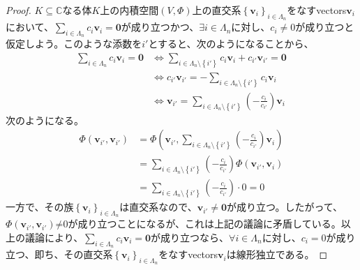 \documentclass[dvipdfmx]{jsarticle}
\begin{document}
\begin{proof}
$K \subseteq \mathbb{C}$なる体$K$上の内積空間$(V,\varPhi)$上の直交系$\left\{ \mathbf{v}_{i} \right\}_{i \in \varLambda_{n}}$をなすvectors$\mathbf{v}_{i}$において、$\sum_{i \in \varLambda_{n}} {c_{i}\mathbf{v}_{i}} = \mathbf{0}$が成り立つかつ、$\exists i \in \varLambda_{n}$に対し、$c_{i} \neq 0$が成り立つと仮定しよう。このような添数を$i'$とすると、次のようになることから、
\begin{align*}
\sum_{i \in \varLambda_{n}} {c_{i}\mathbf{v}_{i}} = \mathbf{0} &\Leftrightarrow \sum_{i \in \varLambda_{n} \setminus \left\{ i' \right\}} {c_{i}\mathbf{v}_{i}} + c_{i'}\mathbf{v}_{i'} = \mathbf{0}\\
&\Leftrightarrow c_{i'}\mathbf{v}_{i'} = - \sum_{i \in \varLambda_{n} \setminus \left\{ i' \right\}} {c_{i}\mathbf{v}_{i}}\\
&\Leftrightarrow \mathbf{v}_{i'} = \sum_{i \in \varLambda_{n} \setminus \left\{ i' \right\}} {\left( - \frac{c_{i}}{c_{i'}} \right)\mathbf{v}_{i}}
\end{align*}
次のようになる。
\begin{align*}
\varPhi\left( \mathbf{v}_{i'},\mathbf{v}_{i'} \right) &= \varPhi\left( \mathbf{v}_{i'},\sum_{i \in \varLambda_{n} \setminus \left\{ i' \right\}} {\left( - \frac{c_{i}}{c_{i'}} \right)\mathbf{v}_{i}} \right)\\
&= \sum_{i \in \varLambda_{n} \setminus \left\{ i' \right\}} {\left( - \frac{c_{i}}{c_{i'}} \right)\varPhi\left( \mathbf{v}_{i'},\mathbf{v}_{i} \right)}\\
&= \sum_{i \in \varLambda_{n} \setminus \left\{ i' \right\}} {\left( - \frac{c_{i}}{c_{i'}} \right) \cdot 0} = 0
\end{align*}
一方で、その族$\left\{ \mathbf{v}_{i} \right\}_{i \in \varLambda_{n}}$は直交系なので、$\mathbf{v}_{i'} \neq \mathbf{0}$が成り立つ。したがって、$\varPhi\left( \mathbf{v}_{i'},\mathbf{v}_{i'} \right)\text{≠}0$が成り立つことになるが、これは上記の議論に矛盾している。以上の議論により、$\sum_{i \in \varLambda_{n}} {c_{i}\mathbf{v}_{i}} = \mathbf{0}$が成り立つなら、$\forall i \in \varLambda_{n}$に対し、$c_{i} = 0$が成り立つ、即ち、その直交系$\left\{ \mathbf{v}_{i} \right\}_{i \in \varLambda_{n}}$をなすvectors$\mathbf{v}_{i}$は線形独立である。
\end{proof}
\end{document}
